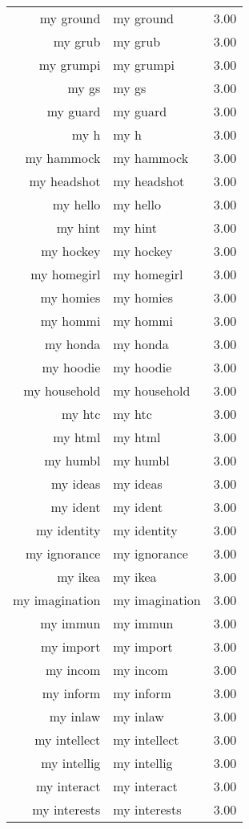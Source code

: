 \begin{table}[ht]
\begin{tabular}{rlr}
  my ground & my ground & 3.00 \\ 
  my grub & my grub & 3.00 \\ 
  my grumpi & my grumpi & 3.00 \\ 
  my gs & my gs & 3.00 \\ 
  my guard & my guard & 3.00 \\ 
  my h & my h & 3.00 \\ 
  my hammock & my hammock & 3.00 \\ 
  my headshot & my headshot & 3.00 \\ 
  my hello & my hello & 3.00 \\ 
  my hint & my hint & 3.00 \\ 
  my hockey & my hockey & 3.00 \\ 
  my homegirl & my homegirl & 3.00 \\ 
  my homies & my homies & 3.00 \\ 
  my hommi & my hommi & 3.00 \\ 
  my honda & my honda & 3.00 \\ 
  my hoodie & my hoodie & 3.00 \\ 
  my household & my household & 3.00 \\ 
  my htc & my htc & 3.00 \\ 
  my html & my html & 3.00 \\ 
  my humbl & my humbl & 3.00 \\ 
  my ideas & my ideas & 3.00 \\ 
  my ident & my ident & 3.00 \\ 
  my identity & my identity & 3.00 \\ 
  my ignorance & my ignorance & 3.00 \\ 
  my ikea & my ikea & 3.00 \\ 
  my imagination & my imagination & 3.00 \\ 
  my immun & my immun & 3.00 \\ 
  my import & my import & 3.00 \\ 
  my incom & my incom & 3.00 \\ 
  my inform & my inform & 3.00 \\ 
  my inlaw & my inlaw & 3.00 \\ 
  my intellect & my intellect & 3.00 \\ 
  my intellig & my intellig & 3.00 \\ 
  my interact & my interact & 3.00 \\ 
  my interests & my interests & 3.00 \\ 

\end{tabular}
\end{table}
